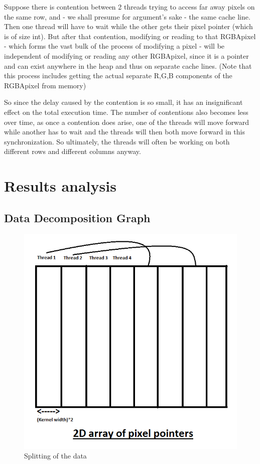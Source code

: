\documentclass[paper=a4, fontsize=11pt]{scrartcl} %
\numberwithin{equation}{section} %
\numberwithin{figure}{section} %
\numberwithin{table}{section} %
\begin{document}
Suppose there is contention between 2 threads trying to access far away pixels on the same row, and - we shall presume for argument's sake - the same cache line. Then one thread will have to wait while the other gets their pixel pointer (which is of size int). But after that contention, modifying or reading to that RGBApixel - which forms the vast bulk of the process of modifying a pixel - will be independent of modifying or reading any other RGBApixel, since it is a pointer and can exist anywhere in the heap and thus on separate cache lines. (Note that this process includes getting the actual separate R,G,B components of the RGBApixel from memory)


So since the delay caused by the contention is so small, it has an insignificant effect on the total execution time. The number of contentions also becomes less over time, as once a contention does arise, one of the threads will move forward while another has to wait and the threads will then both move forward in this synchronization. So ultimately, the threads will often be working on both different rows and different columns anyway.


\section{Results analysis}

\subsection{Data Decomposition Graph}
\begin{figure}[H]
	\centering
	\includegraphics[scale=0.5]{"Task decompostion1"}
	\caption{Splitting of the data}
        \label{kernels}
\end{figure}
\end{document}

